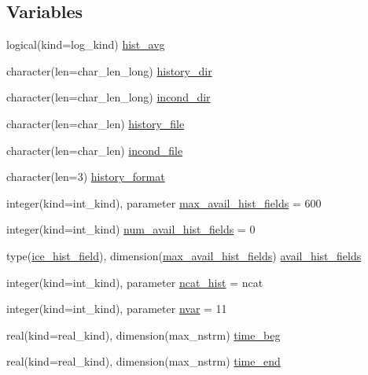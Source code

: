 \subsection*{Variables}
\begin{DoxyCompactItemize}
\item 
logical(kind=log\_\-kind) \hyperlink{namespaceice__history__fields_ad443ef4b2750dd319f461697e217bec3}{hist\_\-avg}
\item 
character(len=char\_\-len\_\-long) \hyperlink{namespaceice__history__fields_ad01cae93d8dc2047429cb0e05167039d}{history\_\-dir}
\item 
character(len=char\_\-len\_\-long) \hyperlink{namespaceice__history__fields_a657cfadfafd4d1cc6407ddcd83a7c868}{incond\_\-dir}
\item 
character(len=char\_\-len) \hyperlink{namespaceice__history__fields_a9c351e060cb10822d8e53ef2ebfaa0fa}{history\_\-file}
\item 
character(len=char\_\-len) \hyperlink{namespaceice__history__fields_aafbbbc135005a06804884fb2cca8d494}{incond\_\-file}
\item 
character(len=3) \hyperlink{namespaceice__history__fields_a1f38b0cd52722e7ed80947313d84936a}{history\_\-format}
\item 
integer(kind=int\_\-kind), parameter \hyperlink{namespaceice__history__fields_abce9e6fec5b792ea13bd34332a858f16}{max\_\-avail\_\-hist\_\-fields} = 600
\item 
integer(kind=int\_\-kind) \hyperlink{namespaceice__history__fields_ae792c3e29c3220a23344fc57f0950944}{num\_\-avail\_\-hist\_\-fields} = 0
\item 
type(\hyperlink{typeice__history__fields_1_1ice__hist__field}{ice\_\-hist\_\-field}), dimension(\hyperlink{namespaceice__history__fields_abce9e6fec5b792ea13bd34332a858f16}{max\_\-avail\_\-hist\_\-fields}) \hyperlink{namespaceice__history__fields_a9614b7f86e2f876b54ea179e0bd10b13}{avail\_\-hist\_\-fields}
\item 
integer(kind=int\_\-kind), parameter \hyperlink{namespaceice__history__fields_ad4675933f882f223e8ec25c5c938b13e}{ncat\_\-hist} = ncat
\item 
integer(kind=int\_\-kind), parameter \hyperlink{namespaceice__history__fields_a36bf5fe8de5bdf3f0fa9bd6840536a96}{nvar} = 11
\item 
real(kind=real\_\-kind), dimension(max\_\-nstrm) \hyperlink{namespaceice__history__fields_af6acdcd2aad4d4b1e7de1048a0654b1b}{time\_\-beg}
\item 
real(kind=real\_\-kind), dimension(max\_\-nstrm) \hyperlink{namespaceice__history__fields_aaead8298e219c1e1308f21fc20ee5acd}{time\_\-end}

\end{DoxyCompactItemize}
